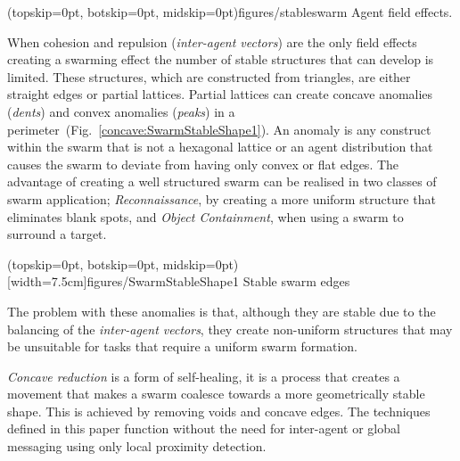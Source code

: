 \documentclass{ieeeaccess}
\begin{document}
\Figure[t!](topskip=0pt, botskip=0pt,
midskip=0pt){figures/stableswarm}
{Agent field effects.\label{methods:FieldEffects}}

When cohesion and repulsion (\textit{inter-agent vectors}) are the only field effects creating a swarming effect the number of stable structures that can develop is limited. These structures, which are constructed from triangles, are either straight edges or partial lattices. Partial lattices can create concave anomalies (\textit{dents}) and convex anomalies (\textit{peaks}) in a perimeter~(Fig.~\ref{concave:SwarmStableShape1}). An anomaly is any construct within the swarm that is not a hexagonal lattice or an agent distribution that causes the swarm to deviate from having only convex or flat edges. The advantage of creating a well structured swarm can be realised in two classes of swarm application; \textit{Reconnaissance}, by creating a more uniform structure that eliminates blank spots, and \textit{Object Containment}, when using a swarm to surround a target.  

\Figure[t!](topskip=0pt, botskip=0pt, midskip=0pt)[width=7.5cm]{figures/SwarmStableShape1}
{Stable swarm edges\label{concave:SwarmStableShape1}}

The problem with these anomalies is that, although they are stable due to the balancing of the \textit{inter-agent vectors}, they create non-uniform structures that may be unsuitable for tasks that require a uniform swarm formation.

\textit{Concave reduction} is a form of self-healing, it is a process that creates a movement that makes a swarm coalesce towards a more geometrically stable shape. This is achieved by removing voids and concave edges. The techniques defined in this paper function without the need for inter-agent or global messaging using only local proximity detection.
\end{document}
